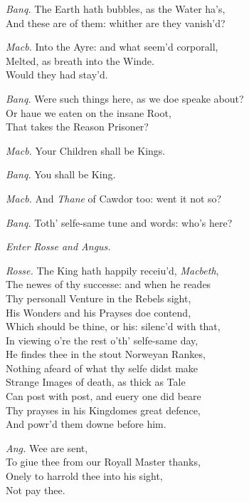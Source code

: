 \documentclass[12pt]{sides}
\newcommand{\dia}[1]{\hskip 15pt\textit{#1}\hskip 6pt}
\newcommand{\cstagedir}[1]{%
  \vspace{6pt}%
  \centerline{\textit{#1}}%
  \vspace{12pt}%
}
\begin{document}
\begin{multicols}{2}
            \dia{Banq.} The Earth hath bubbles, as the Water ha's, \\ And these are of them: whither are they vanish'd?
            
            \dia{Macb.} Into the Ayre: and what seem'd corporall, \\ Melted, as breath into the Winde. \\ Would they had stay'd.

            \dia{Banq.} Were such things here, as we doe speake about? \\ Or haue we eaten on the insane Root, \\ That takes the Reason Prisoner?
            
            \dia{Macb.} Your Children shall be Kings.
            
            \dia{Banq.} You shall be King.
            
            \dia{Macb.} And \textit{Thane} of Cawdor too: went it not so?

            \dia{Banq.} Toth' selfe-same tune and words: who's here?

            \cstagedir{Enter Rosse and Angus.}

            \dia{Rosse.} The King hath happily receiu'd, \textit{Macbeth}, \\ The newes of thy successe: and when he reades \\ Thy personall Venture in the Rebels sight, \\ His Wonders and his Prayses doe contend, \\ Which should be thine, or his: silenc'd with that, \\ In viewing o're the rest o'th' selfe-same day, \\ He findes thee in the stout Norweyan Rankes, \\ Nothing afeard of what thy selfe didst make \\ Strange Images of death, as thick as Tale \\ Can post with post, and euery one did beare \\ Thy prayses in his Kingdomes great defence, \\ And powr'd them downe before him.

            \dia{Ang.} Wee are sent, \\ To giue thee from our Royall Master thanks, \\ Onely to harrold thee into his sight, \\ Not pay thee.


\end{multicols}
\end{document}
